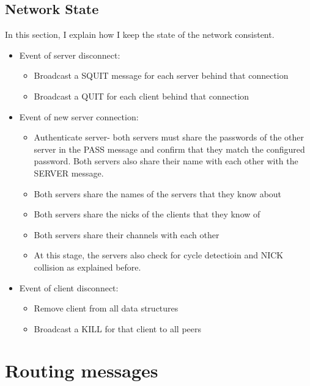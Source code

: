 \documentclass[letterpaper,twocolumn,10pt]{article}
\begin{document}
\subsection{Network State}

In this section, I explain how I keep the state of the network consistent.

\begin{itemize}
	\item Event of server disconnect:
	      \begin{itemize}
		      \item Broadcast a SQUIT message for each server
		            behind that connection
		      \item Broadcast a QUIT for each client behind that
		            connection
	      \end{itemize}

	\item Event of new server connection:
	      \begin{itemize}
		      \item Authenticate server- both servers must share the passwords of the
		            other server in the PASS message and confirm that they match the configured
		            password. Both servers also share their name with each other with the
		            SERVER message.
		      \item Both servers share the names of the servers that they know about
		      \item Both servers share the nicks of the clients that they know of
		      \item Both servers share their channels with each other
		      \item At this stage, the servers also check for cycle detectioin and NICK collision
		            as explained before.
	      \end{itemize}

	\item Event of client disconnect:
	      \begin{itemize}
		      \item Remove client from all data structures
		      \item Broadcast a KILL for that client to all peers
	      \end{itemize}

\end{itemize}

\section{Routing messages}
\end{document}
